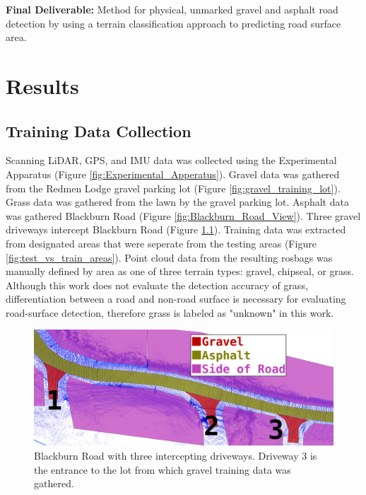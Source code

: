 \documentclass[numbered,pdftex]{ohio-etd}
\begin{document}
{{		{\textbf{Final Deliverable:} Method for physical, unmarked gravel and asphalt road detection by using a terrain classification approach to predicting road surface area.}
		
	} %

\chapter{Results}{
	
	\section{Training Data Collection}\label{sec:training-data-collection}{
	
		{Scanning LiDAR, GPS, and IMU data was collected using the Experimental Apparatus (Figure \ref{fig:Experimental_Apperatus}). Gravel data was gathered from the Redmen Lodge gravel parking lot (Figure \ref{fig:gravel_training_lot}). Grass data was gathered from the lawn by the gravel parking lot. Asphalt data was gathered Blackburn Road (Figure \ref{fig:Blackburn_Road_View}). Three gravel driveways intercept Blackburn Road (Figure \ref{fig:road_areas_annotated_2}). Training data was extracted from designated areas that were seperate from the testing areas (Figure \ref{fig:test_vs_train_areas}). Point cloud data from the resulting rosbags was manually defined by area as one of three terrain types: gravel, chipseal, or grass. Although this work does not evaluate the detection accuracy of grass, differentiation between a road and non-road surface is necessary for evaluating road-surface detection, therefore grass is labeled as "unknown" in this work.} 
		
		
		
		\begin{figure}[H]
			\centering
			\includegraphics[width=0.65\linewidth]{Defense_Images/road_areas_annotated_2}
			\caption[Blackburn Road Overlays]{Blackburn Road with three intercepting driveways. Driveway $3$ is the entrance to the lot from which gravel training data was gathered. }
			\label{fig:road_areas_annotated_2}
		\end{figure}

}}}
\end{document}
